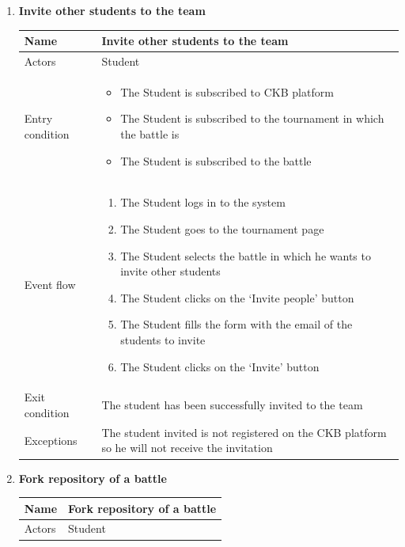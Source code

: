 \begin{enumerate}[label=UC\arabic*:]
\begin{tabular}{|p{3cm}|p{8cm}|}
        \hline
    \end{tabular}
    \item \textbf{Invite other students to the team} \\
    \begin{tabular}{|p{3cm}|p{8cm}|}
        \hline
        Name & Invite other students to the team \\
        \hline
        Actors & Student \\
        \hline
        Entry condition &
        \begin{itemize}
            \item The Student is subscribed to CKB platform
            \item The Student is subscribed to the tournament in which the battle is
            \item The Student is subscribed to the battle
        \end{itemize} \\
        \hline
        Event flow &
        \begin{enumerate}[label=\arabic*.]
            \item The Student logs in to the system
            \item The Student goes to the tournament page
            \item The Student selects the battle in which he wants to invite other students
            \item The Student clicks on the `Invite people' button
            \item The Student fills the form with the email of the students to invite
            \item The Student clicks on the `Invite' button
        \end{enumerate} \\
        \hline
        Exit condition & The student has been successfully invited to the team \\
        \hline
        Exceptions & The student invited is not registered on the CKB platform so he will not receive the invitation \\
        \hline
    \end{tabular}
    \item \textbf{Fork repository of a battle} \\
    \begin{tabular}{|p{3cm}|p{8cm}|}
        \hline
        Name & Fork repository of a battle \\
        \hline
        Actors & Student \\

\end{tabular}
\end{enumerate}
